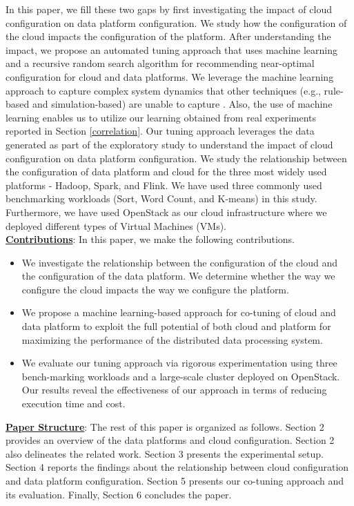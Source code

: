 \documentclass[3p]{elsarticle}
\begin{document}
In this paper, we fill these two gaps by first investigating the impact of cloud configuration on data platform configuration. We study how the configuration of the cloud impacts the configuration of the platform. After understanding the impact, we propose an automated tuning approach that uses machine learning and a recursive random search algorithm for recommending near-optimal configuration for cloud and data platforms. We leverage the machine learning approach to capture complex system dynamics that other techniques (e.g., rule-based and simulation-based) are unable to capture \cite{herodotou2020survey}. Also, the use of machine learning enables us to utilize our learning obtained from real experiments reported in Section \ref{correlation}. Our tuning approach leverages the data generated as part of the exploratory study to understand the impact of cloud configuration on data platform configuration. We study the relationship between the configuration of data platform and cloud for the three most widely used platforms - Hadoop, Spark, and Flink. We have used three commonly used benchmarking workloads (Sort, Word Count, and K-means) in this study. Furthermore, we have used OpenStack as our cloud infrastructure where we deployed different types of Virtual Machines (VMs).\\

\textbf{\underline{Contributions}}: In this paper, we make the following contributions.
\begin{itemize}
    \item We investigate the relationship between the configuration of the cloud and the configuration of the data platform. We determine whether the way we configure the cloud impacts the way we configure the platform. 
    \item We propose a machine learning-based approach for co-tuning of cloud and data platform to exploit the full potential of both cloud and platform for maximizing the performance of the distributed data processing system. 
    \item We evaluate our tuning approach via rigorous experimentation using three bench-marking workloads and a large-scale cluster deployed on OpenStack. Our results reveal the effectiveness of our approach in terms of reducing execution time and cost. 
\end{itemize}

\textbf{\underline{Paper Structure}}: The rest of this paper is organized as follows. Section 2 provides an overview of the data platforms and cloud configuration. Section 2 also delineates the related work. Section 3 presents the experimental setup. Section 4 reports the findings about the relationship between cloud configuration and data platform configuration. Section 5 presents our co-tuning approach and its evaluation. Finally, Section 6 concludes the paper.
\end{document}
